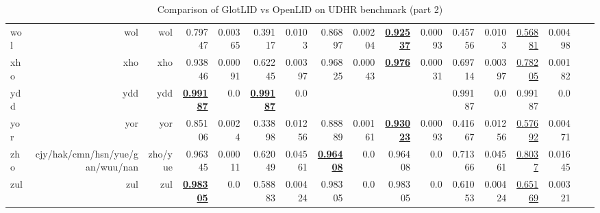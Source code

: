 \documentclass[11pt]{article}
\def\udhr{UDHR\xspace}
\def\edin{OpenLID\xspace}
\begin{document}
\begin{table*}[h]
{\begin{tabular}{lrrrrrrrrrrrrrrrr}
wol         & wol         & wol         & 0.79747         & 0.00365         & 0.39117         & 0.0103         & 0.86897         & 0.00204         & \textbf{\underline{0.92537}}         & 0.00093         & 0.45756         & 0.0103         & \underline{0.56881}         & 0.00498         \\
xho         & xho         & xho         & 0.93846         & 0.00091         & 0.62245         & 0.00397         & 0.96825         & 0.00043         & \textbf{\underline{0.976}}         & 0.00031         & 0.69714         & 0.00397         & \underline{0.78205}         & 0.00182         \\
ydd         & ydd         & ydd         & \textbf{\underline{0.99187}}         & 0.0         & \textbf{\underline{0.99187}}         & 0.0         &         &         &         &         & 0.99187         & 0.0         & 0.99187         & 0.0         \\
yor         & yor         & yor         & 0.85106         & 0.0024         & 0.33898         & 0.01256         & 0.88889         & 0.00161         & \textbf{\underline{0.93023}}         & 0.00093         & 0.41667         & 0.01256         & \underline{0.57692}         & 0.00471         \\
zho         & cjy/hak/cmn/hsn/yue/gan/wuu/nan         & zho/yue         & 0.96345         & 0.00011         & 0.62049         & 0.04561         & \textbf{\underline{0.96408}}         & 0.0         & 0.96408         & 0.0         & 0.71366         & 0.04561         & \underline{0.8037}         & 0.01645         \\
zul         & zul         & zul         & \textbf{\underline{0.98305}}         & 0.0         & 0.58883         & 0.00424         & 0.98305         & 0.0         & 0.98305         & 0.0         & 0.61053         & 0.00424         & \underline{0.65169}         & 0.00321         \\
\end{tabular}
}
\caption{Comparison of GlotLID vs \edin on \udhr benchmark (part 2)}
\label{tab:appendix_glotlid_lid201_udhr_2}
\end{table*}
 
\end{document}
